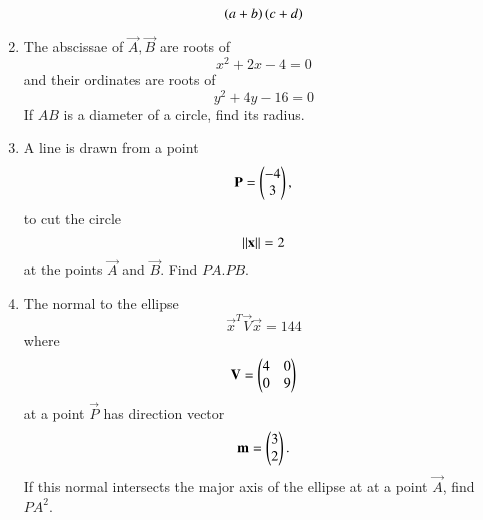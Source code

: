 \documentclass[journal,12pt,twocolumn]{IEEEtran}
\begin{document}
\begin{enumerate}[label=\arabic*.]
\begin{equation}
\left(a+b\right)\left(c+d\right)
\end{equation}
\item The abscissae of $\vec{A},\vec{B}$ are roots of
\begin{equation}
x^2+2x-4 = 0
\end{equation}
and their ordinates are roots of 
\begin{equation}
y^2+4y-16 = 0
\end{equation}
If $AB$ is a diameter of a circle, find its radius.
\item A line is drawn from a point 
\begin{equation}
\mathbf{P}=\begin{pmatrix}-4 \\ 3 \end{pmatrix},
\end{equation}
%
to cut the circle 
\begin{equation}
\left\Vert\mathbf{x}\right\Vert= 2
\end{equation}
%
at the points $\vec{A}$ and $\vec{B}$.  Find $PA.PB$.
\item The normal to the ellipse
\begin{equation}
\vec{x}^T\vec{V}\vec{x} =144
\end{equation}
%
where
\begin{equation}
\mathbf{V} = \begin{pmatrix} 4 & 0 \\ 0 & 9\end{pmatrix}
\end{equation}
%
at a point $\vec{P}$ has direction vector 
\begin{equation}
\mathbf{m}=\begin{pmatrix}3 \\ 2 \end{pmatrix}.
\end{equation}
%
If this normal intersects the major axis of the ellipse at at a point $\vec{A}$, find $PA^2$.
\end{enumerate}
\end{document}
